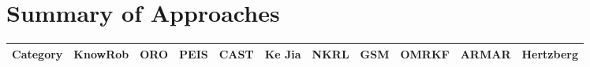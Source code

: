 \documentclass[a4paper, twocolumn]{article}
\begin{document}
\section{Summary of Approaches}
\label{sect|summary}

\begin{landscape}
\begin{table}\footnotesize
\begin{center}

\begin{tabular}{cp{4.5cm}p{2.3cm}p{2cm}p{1cm}p{1cm}p{1cm}p{1cm}p{1.5cm}p{2cm}p{1.5cm}p{1.5cm}}
\toprule
\multicolumn{2}{c}{\bf Category} & {\sc KnowRob} & {ORO} & {\sc PEIS} & {\sc CAST} & {\sc Ke Jia} & {\sc NKRL} & {\sc GSM} & {\sc OMRKF} & {\sc ARMAR} & {\sc Hertzberg} \\

\midrule


\end{tabular}
\end{center}
\end{table}
\end{landscape}
\end{document}
